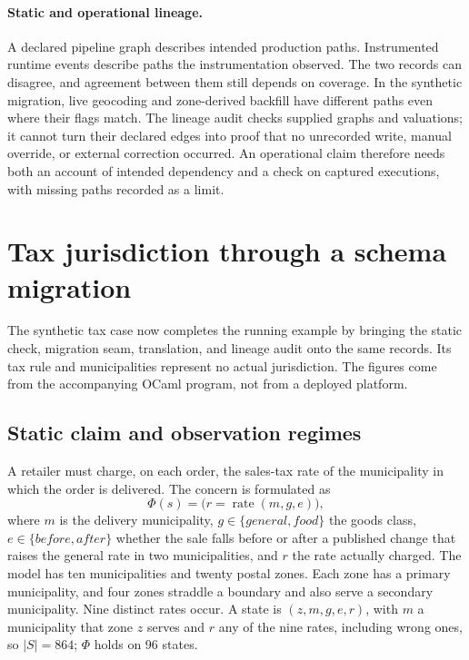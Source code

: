 \documentclass[11pt]{article}
\theoremstyle{definition}
\begin{document}
\paragraph{Static and operational lineage.} A declared pipeline graph describes intended production paths. Instrumented runtime events describe paths the instrumentation observed. The two records can disagree, and agreement between them still depends on coverage. In the synthetic migration, live geocoding and zone-derived backfill have different paths even where their flags match. The lineage audit checks supplied graphs and valuations; it cannot turn their declared edges into proof that no unrecorded write, manual override, or external correction occurred. An operational claim therefore needs both an account of intended dependency and a check on captured executions, with missing paths recorded as a limit.\par\medskip

\section{Tax jurisdiction through a schema migration}\label{ex:sec:case}

The synthetic tax case now completes the running example by bringing the static check, migration seam, translation, and lineage audit onto the same records. Its tax rule and municipalities represent no actual jurisdiction. The figures come from the accompanying OCaml program, not from a deployed platform.

\subsection{Static claim and observation regimes}

A retailer must charge, on each order, the sales-tax rate of the municipality in which the order is delivered. The concern is formulated as
\[
\Phi(s)=\bigl(r=\operatorname{rate}(m,g,e)\bigr),
\]
where $m$ is the delivery municipality, $g \in \{\mathit{general},\mathit{food}\}$ the goods class, $e \in \{\mathit{before},\mathit{after}\}$ whether the sale falls before or after a published change that raises the general rate in two municipalities, and $r$ the rate actually charged. The model has ten municipalities and twenty postal zones. Each zone has a primary municipality, and four zones straddle a boundary and also serve a secondary municipality. Nine distinct rates occur. A state is $(z,m,g,e,r)$, with $m$ a municipality that zone $z$ serves and $r$ any of the nine rates, including wrong ones, so $|S|=864$; $\Phi$ holds on 96 states.
\end{document}
